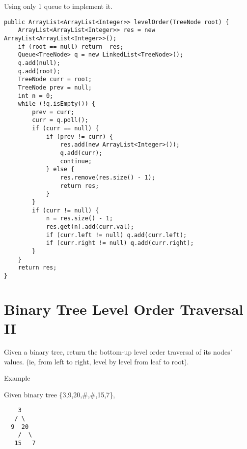\documentclass[9pt, b5paaper]{book}
\begin{document}
Using only 1 queue to implement it.
\begin{verbatim}
public ArrayList<ArrayList<Integer>> levelOrder(TreeNode root) {
    ArrayList<ArrayList<Integer>> res = new ArrayList<ArrayList<Integer>>();
    if (root == null) return  res;
    Queue<TreeNode> q = new LinkedList<TreeNode>();
    q.add(null);
    q.add(root);
    TreeNode curr = root;
    TreeNode prev = null;
    int n = 0;
    while (!q.isEmpty()) {
        prev = curr;
        curr = q.poll();
        if (curr == null) {
            if (prev != curr) {
                res.add(new ArrayList<Integer>());
                q.add(curr);
                continue;
            } else {
                res.remove(res.size() - 1);
                return res;   
            }
        }
        if (curr != null) {
            n = res.size() - 1;
            res.get(n).add(curr.val);
            if (curr.left != null) q.add(curr.left);
            if (curr.right != null) q.add(curr.right);
        }
    }
    return res;
}
\end{verbatim}
\section{Binary Tree Level Order Traversal II}
\label{sec-5-18}

Given a binary tree, return the bottom-up level order traversal of its nodes' values. (ie, from left to right, level by level from leaf to root).

Example

Given binary tree \{3,9,20,\#,\#,15,7\},
\begin{verbatim}
    3
   / \
  9  20
    /  \
   15   7
\end{verbatim}
\end{document}
